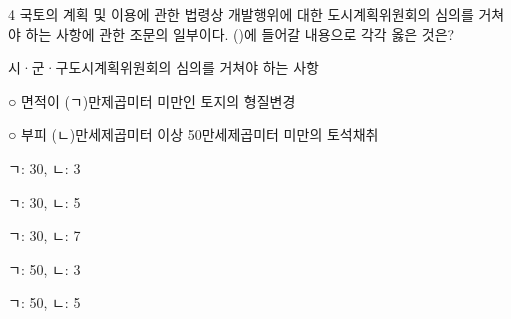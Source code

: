 \begin{question}{4}
국토의 계획 및 이용에 관한 법령상 개발행위에 대한 도시계획위원회의 심의를 거쳐야 하는 사항에 관한 조문의 일부이다. (\quad)에 들어갈 내용으로 각각 옳은 것은?
\begin{framedtext}
시·군·구도시계획위원회의 심의를 거쳐야 하는 사항 \par
○ 면적이 (ㄱ)만제곱미터 미만인 토지의 형질변경 \par
○ 부피 (ㄴ)만세제곱미터 이상 50만세제곱미터 미만의 토석채취 \par
\end{framedtext}
\begin{choices}
  \item ㄱ: 30, ㄴ: 3
  \item ㄱ: 30, ㄴ: 5
  \item ㄱ: 30, ㄴ: 7
  \item ㄱ: 50, ㄴ: 3
  \item ㄱ: 50, ㄴ: 5
\end{choices}
\end{question}

